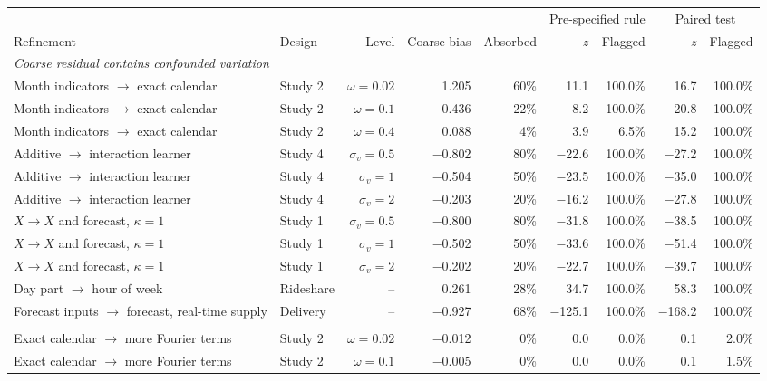 \begin{tabular}{llrrrrrrr}
\toprule
 & & & & & \multicolumn{2}{c}{Pre-specified rule} & \multicolumn{2}{c}{Paired test} \\
\cmidrule(lr){6-7}\cmidrule(lr){8-9}
Refinement & Design & Level & Coarse bias & Absorbed & $z$ & Flagged & $z$ & Flagged \\
\midrule
\multicolumn{9}{l}{\emph{Coarse residual contains confounded variation}} \\
Month indicators $\to$ exact calendar & Study 2 & $\omega = 0.02$ & 1.205 & 60\% & 11.1 & 100.0\% & 16.7 & 100.0\% \\
Month indicators $\to$ exact calendar & Study 2 & $\omega = 0.1$ & 0.436 & 22\% & 8.2 & 100.0\% & 20.8 & 100.0\% \\
Month indicators $\to$ exact calendar & Study 2 & $\omega = 0.4$ & 0.088 & 4\% & 3.9 & 6.5\% & 15.2 & 100.0\% \\
Additive $\to$ interaction learner & Study 4 & $\sigma_v = 0.5$ & $-$0.802 & 80\% & $-$22.6 & 100.0\% & $-$27.2 & 100.0\% \\
Additive $\to$ interaction learner & Study 4 & $\sigma_v = 1$ & $-$0.504 & 50\% & $-$23.5 & 100.0\% & $-$35.0 & 100.0\% \\
Additive $\to$ interaction learner & Study 4 & $\sigma_v = 2$ & $-$0.203 & 20\% & $-$16.2 & 100.0\% & $-$27.8 & 100.0\% \\
$X \to X$ and forecast, $\kappa = 1$ & Study 1 & $\sigma_v = 0.5$ & $-$0.800 & 80\% & $-$31.8 & 100.0\% & $-$38.5 & 100.0\% \\
$X \to X$ and forecast, $\kappa = 1$ & Study 1 & $\sigma_v = 1$ & $-$0.502 & 50\% & $-$33.6 & 100.0\% & $-$51.4 & 100.0\% \\
$X \to X$ and forecast, $\kappa = 1$ & Study 1 & $\sigma_v = 2$ & $-$0.202 & 20\% & $-$22.7 & 100.0\% & $-$39.7 & 100.0\% \\
Day part $\to$ hour of week & Rideshare & -- & 0.261 & 28\% & 34.7 & 100.0\% & 58.3 & 100.0\% \\
Forecast inputs $\to$ forecast, real-time supply & Delivery & -- & $-$0.927 & 68\% & $-$125.1 & 100.0\% & $-$168.2 & 100.0\% \\
\addlinespace
\multicolumn{9}{l}{\emph{It does not}} \\
Exact calendar $\to$ more Fourier terms & Study 2 & $\omega = 0.02$ & $-$0.012 & 0\% & 0.0 & 0.0\% & 0.1 & 2.0\% \\
Exact calendar $\to$ more Fourier terms & Study 2 & $\omega = 0.1$ & $-$0.005 & 0\% & 0.0 & 0.0\% & 0.1 & 1.5\% \\

\end{tabular}
